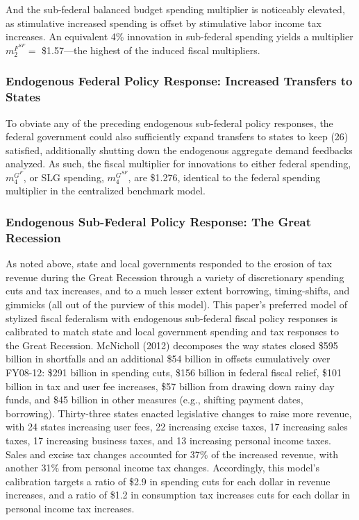 \documentclass[12pt,letterpaper]{article}
\begin{document}
And the sub-federal balanced budget spending multiplier is noticeably elevated, as stimulative increased spending is offset by stimulative labor income tax increases. An equivalent 4\% innovation in sub-federal  spending yields a multiplier $m^{F^{SF}}_2 = $ \$1.57---the highest of the induced fiscal multipliers. 
\bigskip

\subsubsection{Endogenous  Federal Policy Response: Increased Transfers to States}
To obviate any of the preceding endogenous sub-federal policy responses, the federal government could also sufficiently expand transfers to states to keep (26) satisfied, additionally shutting down the endogenous aggregate demand feedbacks analyzed. As such, the fiscal multiplier for innovations to either federal spending, $m^{G^{F}}_4 $, or SLG spending, $m^{G^{SF}}_4 $, are \$1.276, identical to the federal spending multiplier in the centralized benchmark model. 

\subsubsection{Endogenous Sub-Federal Policy Response: The Great Recession}
As noted above, state and local governments responded to the erosion of tax revenue during the Great Recession through a variety of discretionary spending cuts and tax increases, and to a much lesser extent borrowing, timing-shifts, and gimmicks (all out of the purview of this model). This paper's preferred model of stylized fiscal federalism with endogenous sub-federal fiscal policy responses is calibrated to match state and local government spending and tax responses to the Great Recession. McNicholl (2012) decomposes the way states closed \$595 billion in shortfalls and an additional \$54 billion in offsets cumulatively over FY08-12: \$291 billion in spending cuts, \$156 billion in federal fiscal relief, \$101 billion in tax and user fee increases, \$57 billion from drawing down rainy day funds, and \$45 billion in other measures (e.g., shifting payment dates, borrowing). Thirty-three states enacted legislative changes to raise more revenue, with 24 states increasing user fees, 22 increasing excise taxes, 17 increasing sales taxes, 17 increasing business taxes, and 13 increasing personal income taxes. Sales and excise tax changes accounted for 37\% of the increased revenue, with another 31\% from personal income tax changes. Accordingly, this model's calibration targets a ratio of \$2.9 in spending cuts for each dollar in revenue increases, and a ratio of \$1.2 in consumption tax increases cuts for each dollar in personal income tax increases. 
\end{document}
